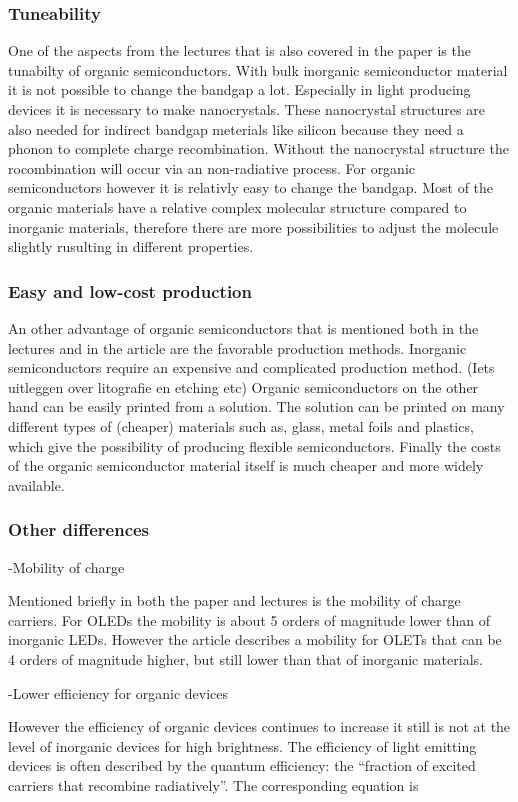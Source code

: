 \subsubsection{Tuneability}
One of the aspects from the lectures that is also covered in the paper is the tunabilty of organic semiconductors. With bulk inorganic semiconductor material it is not possible to change the bandgap a lot. Especially in light producing devices it is necessary to make nanocrystals. These nanocrystal structures are also needed for indirect bandgap meterials like silicon because they need a phonon to complete charge recombination. Without the nanocrystal structure the rocombination will occur via an non-radiative process. For organic semiconductors however it is relativly easy to change the bandgap. Most of the organic materials have a relative complex molecular structure compared to inorganic materials, therefore there are more possibilities to adjust the molecule slightly rusulting in different properties. 
\subsubsection{Easy and low-cost production}
An other advantage of organic semiconductors that is mentioned both in the lectures and in the article are the favorable production methods. Inorganic semiconductors require an expensive and complicated production method. (Iets uitleggen over litografie en etching etc) Organic semiconductors on the other hand can be easily printed from a solution. The solution can be printed on many different types of (cheaper) materials such as, glass, metal foils and plastics, which give the possibility of producing flexible semiconductors. Finally the costs of the organic semiconductor material itself is much cheaper and more widely available.
\subsubsection{Other differences}
-Mobility of charge

Mentioned briefly in both the paper and lectures is the mobility of charge carriers. For OLEDs the mobility is about 5 orders of magnitude lower than of inorganic LEDs. However the article describes a mobility for OLETs that can be 4 orders of magnitude higher, but still lower than that of inorganic materials.

-Lower efficiency for organic devices

However the efficiency of organic devices continues to increase it still is not at the level of inorganic devices for high brightness. The efficiency of light emitting devices is often described by the quantum efficiency: the ``fraction of excited carriers that recombine radiatively''. The corresponding equation is

